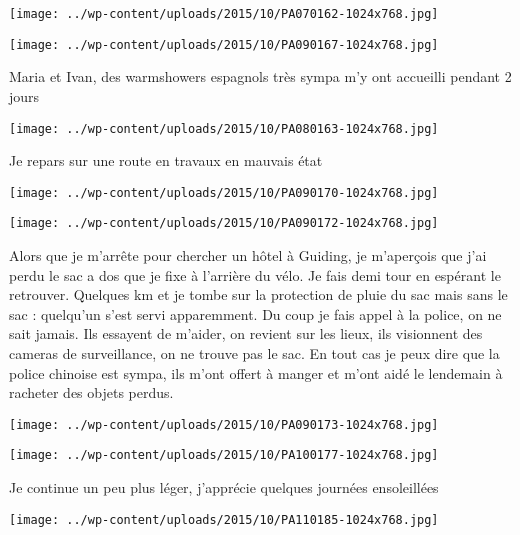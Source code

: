 \centerline{\texttt{[image: ../wp-content/uploads/2015/10/PA070162-1024x768.jpg]} } 
 \newline
 \newline
\centerline{\texttt{[image: ../wp-content/uploads/2015/10/PA090167-1024x768.jpg]} } 
 \newline
 Maria et Ivan, des warmshowers espagnols très sympa m'y ont accueilli pendant 2 jours \newline
 \newline
\centerline{\texttt{[image: ../wp-content/uploads/2015/10/PA080163-1024x768.jpg]} } 
 \newline
 Je repars sur une route en travaux en mauvais état \newline
 \newline
\centerline{\texttt{[image: ../wp-content/uploads/2015/10/PA090170-1024x768.jpg]} } 
 \newline
 \newline
\centerline{\texttt{[image: ../wp-content/uploads/2015/10/PA090172-1024x768.jpg]} } 
 \newline
 Alors que je m'arrête pour chercher un hôtel à Guiding, je m'aperçois que j'ai perdu le sac a dos que je fixe à l'arrière du vélo. Je fais demi tour en espérant le retrouver. Quelques km et je tombe sur la protection de pluie du sac mais sans le sac : quelqu'un s'est servi apparemment. \newline
 Du coup je fais appel à la police, on ne sait jamais. Ils essayent de m'aider, on revient sur les lieux, ils visionnent des cameras de surveillance, on ne trouve pas le sac. En tout cas je peux dire que la police chinoise est sympa, ils m'ont offert à manger et m'ont aidé le lendemain à racheter des objets perdus. \newline
 \newline
\centerline{\texttt{[image: ../wp-content/uploads/2015/10/PA090173-1024x768.jpg]} } 
 \newline
 \newline
\centerline{\texttt{[image: ../wp-content/uploads/2015/10/PA100177-1024x768.jpg]} } 
 \newline
 Je continue un peu plus léger, j'apprécie quelques journées ensoleillées \newline
 \newline
\centerline{\texttt{[image: ../wp-content/uploads/2015/10/PA110185-1024x768.jpg]} } 
 \newline
 \newline
